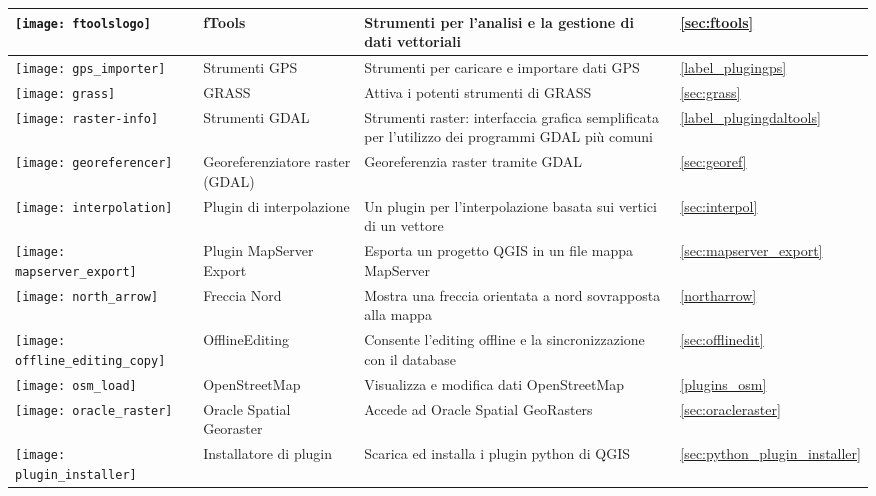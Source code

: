 {\begin{longtable}{|p{1.2cm}|p{3.8cm}|p{7.5cm}|p{3cm}|}
\hline
\texttt{[image: ftoolslogo]}
 & fTools \index{plugins!ftools}& Strumenti per l'analisi e la gestione di dati vettoriali &  \ref{sec:ftools}\\
\hline
\texttt{[image: gps\_importer]}
 & Strumenti GPS \index{plugins!gps}& Strumenti per caricare e importare dati GPS &  \ref{label_plugingps}\\
\hline
\texttt{[image: grass]}
 & GRASS \index{plugin!strumenti GRASS} & Attiva i potenti strumenti di GRASS &  \ref{sec:grass}\\
\hline
\texttt{[image: raster-info]}
 & Strumenti GDAL \index{plugins!strumenti gdal} & Strumenti raster: interfaccia grafica semplificata per l'utilizzo dei programmi GDAL più comuni &  \ref{label_plugingdaltools}\\
\hline
\texttt{[image: georeferencer]}
 & Georeferenziatore raster (GDAL) \index{plugin!georeferenziatore} & Georeferenzia raster tramite GDAL &  \ref{sec:georef}\\
\hline
\texttt{[image: interpolation]}
& Plugin di interpolazione \index{plugins!Interpolazione}& Un plugin per l'interpolazione basata sui vertici di un vettore &  \ref{sec:interpol}\\
\hline
\texttt{[image: mapserver\_export]}
& Plugin MapServer Export \index{plugins!esportazione mapserver}& Esporta un progetto QGIS in un file mappa MapServer &  \ref{sec:mapserver_export} \\
\hline
\texttt{[image: north\_arrow]}
& Freccia Nord \index{plugins!freccia nord}& Mostra una freccia orientata a nord sovrapposta alla mappa &  \ref{northarrow}\\
\hline
\texttt{[image: offline\_editing\_copy]}
 & OfflineEditing & Consente l'editing offline e la sincronizzazione con il database &  \ref{sec:offlinedit}\\
\hline
\texttt{[image: osm\_load]}
 & OpenStreetMap & Visualizza e modifica dati OpenStreetMap &  \ref{plugins_osm}\\
\hline
\texttt{[image: oracle\_raster]}
 & Oracle Spatial Georaster \index{plugins!oracle georaster}& Accede ad Oracle Spatial GeoRasters &  
\ref{sec:oracleraster}\\
\hline
\texttt{[image: plugin\_installer]}
 & Installatore di plugin \index{plugins!installatore plugin} & Scarica ed installa i plugin python di QGIS &  \ref{sec:python_plugin_installer}\\

\end{longtable}}

